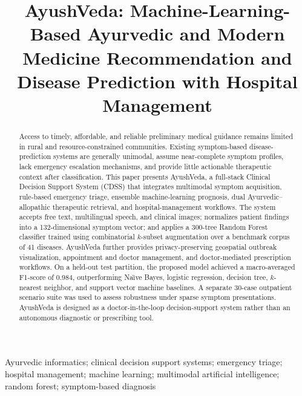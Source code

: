 \documentclass[conference]{IEEEtran}
\begin{document}
\title{AyushVeda: Machine-Learning-Based Ayurvedic and Modern Medicine Recommendation and Disease Prediction with Hospital Management}

\author{
}

\maketitle

\begin{abstract}
Access to timely, affordable, and reliable preliminary medical guidance remains limited in rural and resource-constrained communities. Existing symptom-based disease-prediction systems are generally unimodal, assume near-complete symptom profiles, lack emergency escalation mechanisms, and provide little actionable therapeutic context after classification. This paper presents AyushVeda, a full-stack Clinical Decision Support System (CDSS) that integrates multimodal symptom acquisition, rule-based emergency triage, ensemble machine-learning prognosis, dual Ayurvedic--allopathic therapeutic retrieval, and hospital-management workflows. The system accepts free text, multilingual speech, and clinical images; normalizes patient findings into a 132-dimensional symptom vector; and applies a 300-tree Random Forest classifier trained using combinatorial $k$-subset augmentation over a benchmark corpus of 41 diseases. AyushVeda further provides privacy-preserving geospatial outbreak visualization, appointment and doctor management, and doctor-mediated prescription workflows. On a held-out test partition, the proposed model achieved a macro-averaged F1-score of 0.984, outperforming Na{\"\i}ve Bayes, logistic regression, decision tree, $k$-nearest neighbor, and support vector machine baselines. A separate 30-case outpatient scenario suite was used to assess robustness under sparse symptom presentations. AyushVeda is designed as a doctor-in-the-loop decision-support system rather than an autonomous diagnostic or prescribing tool.
\end{abstract}

\begin{IEEEkeywords}
Ayurvedic informatics; clinical decision support systems; emergency triage; hospital management; machine learning; multimodal artificial intelligence; random forest; symptom-based diagnosis
\end{IEEEkeywords}
\end{document}
